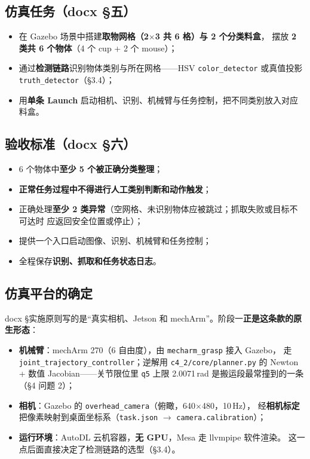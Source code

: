 \documentclass[12pt,a4paper]{ctexart}
\begin{document}
\subsection*{仿真任务（docx §五）}

\begin{itemize}[leftmargin=1.6em]
  \item 在 Gazebo 场景中搭建\textbf{取物网格（2$\times$3 共 6 格）与 2 个分类料盒}，
        摆放 \textbf{2 类共 6 个物体}（4 个 cup + 2 个 mouse）；
  \item 通过\textbf{检测链路}识别物体类别与所在网格——HSV \texttt{color\_detector}
        或真值投影 \texttt{truth\_detector}（§3.4）；
  \item 用\textbf{单条 Launch} 启动相机、识别、机械臂与任务控制，把不同类别放入对应料盒。
\end{itemize}

\subsection*{验收标准（docx §六）}

\begin{itemize}[leftmargin=1.6em]
  \item 6 个物体中\textbf{至少 5 个被正确分类整理}；
  \item \textbf{正常任务过程中不得进行人工类别判断和动作触发}；
  \item 正确处理\textbf{至少 2 类异常}（空网格、未识别物体应被跳过；抓取失败或目标不可达时
        应返回安全位置或停止）；
  \item 提供一个入口启动图像、识别、机械臂和任务控制；
  \item 全程保存\textbf{识别、抓取和任务状态日志}。
\end{itemize}

\subsection*{仿真平台的确定}

docx §实施原则写的是“真实相机、Jetson 和 mechArm”。阶段一\textbf{正是这条款的原生形态}：

\begin{itemize}[leftmargin=1.6em]
  \item \textbf{机械臂}：mechArm 270（6 自由度），由 \texttt{mecharm\_grasp} 接入 Gazebo，
        走 \texttt{joint\_trajectory\_controller}；逆解用 \texttt{c4\_2/core/planner.py}
        的 Newton + 数值 Jacobian——关节限位里 \texttt{q5} 上限 2.0071\,rad
        是搬运段最常撞到的一条（§4 问题 2）；
  \item \textbf{相机}：Gazebo 的 \texttt{overhead\_camera}（俯瞰，640$\times$480，10\,Hz），
        经\textbf{相机标定}把像素映射到桌面坐标系（\texttt{task.json} $\to$
        \texttt{camera.calibration}）；
  \item \textbf{运行环境}：AutoDL 云机容器，\textbf{无 GPU}，Mesa 走 llvmpipe 软件渲染。
        这一点后面直接决定了检测链路的选型（§3.4）。
\end{itemize}
\end{document}
